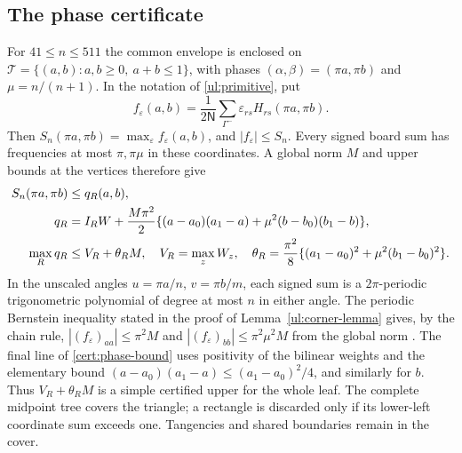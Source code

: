 \subsection{The phase certificate}
For $41\leq n\leq511$ the common envelope is enclosed on
$\mathcal T=\{(a,b):a,b\geq0,\ a+b\leq1\}$, with phases
$(\alpha,\beta)=(\pi a,\pi b)$ and $\mu=n/(n+1)$.
In the notation of \eqref{ul:primitive}, put
\[
 f_\varepsilon(a,b)=\frac1{2\mathsf N}
       \sum_{\Gamma^-}\varepsilon_{rs}H_{rs}(\pi a,\pi b).
\]
Then $S_n(\pi a,\pi b)=\max_\varepsilon f_\varepsilon(a,b)$,
and $|f_\varepsilon|\leq S_n$. Every signed board sum has frequencies
at most $\pi,\pi \mu$ in these coordinates. A global norm $M$
and upper bounds at the vertices therefore give
\begin{align}\label{cert:phase-bound}
 S_n(\pi a,\pi b)&\leq q_R(a,b),\\
 q_R&=I_RW+\frac{M\pi^2}{2}
 \{(a-a_0)(a_1-a)+\mu^2(b-b_0)(b_1-b)\},\notag\\
 \max_Rq_R&\leq V_R+\theta_RM,
 \quad V_R=\max_zW_z,\quad
 \theta_R=\frac{\pi^2}{8}\{(a_1-a_0)^2+\mu^2(b_1-b_0)^2\}.\notag
\end{align}
In the unscaled angles $u=\pi a/n$, $v=\pi b/m$, each signed sum
is a $2\pi$-periodic trigonometric polynomial of degree at most $n$
in either angle. The periodic Bernstein inequality stated in the proof
of Lemma~\ref{ul:corner-lemma} gives, by the chain rule,
$|(f_\varepsilon)_{aa}|\leq\pi^2M$ and
$|(f_\varepsilon)_{bb}|\leq\pi^2\mu^2M$ from the global norm
\cite{Boas1954}.
The final line of \eqref{cert:phase-bound} uses positivity of the
bilinear weights and the elementary bound
$(a-a_0)(a_1-a)\leq(a_1-a_0)^2/4$, and similarly for $b$.
Thus $V_R+\theta_RM$ is a simple certified upper for the whole leaf.
The complete midpoint tree covers the triangle; a rectangle
is discarded only if its lower-left coordinate sum exceeds one.
Tangencies and shared boundaries remain in the cover.

